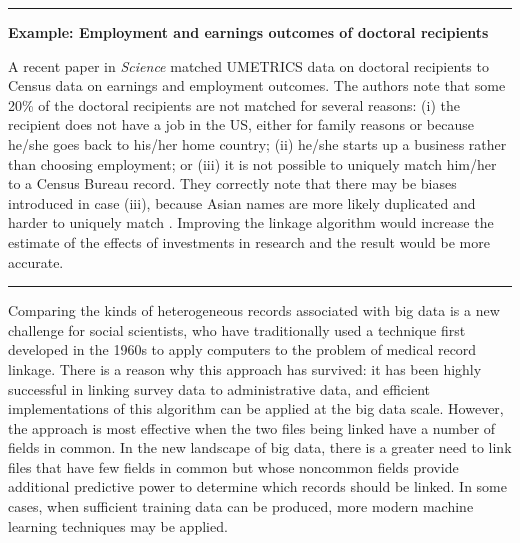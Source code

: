 \documentclass[]{krantz}
\begin{document}
\begin{center}\rule{0.5\linewidth}{\linethickness}\end{center}

\textbf{Example: Employment and earnings outcomes of doctoral
recipients}

A recent paper in \emph{Science} matched UMETRICS data on doctoral
recipients to Census data on earnings and employment outcomes. The
authors note that some 20\% of the doctoral recipients are not matched
for several reasons: (i) the recipient does not have a job in the US,
either for family reasons or because he/she goes back to his/her home
country; (ii) he/she starts up a business rather than choosing
employment; or (iii) it is not possible to uniquely match him/her to a
Census Bureau record. They correctly note that there may be biases
introduced in case (iii), because Asian names are more likely duplicated
and harder to uniquely match \citep{zolas2015wrapping}. Improving the
linkage algorithm would increase the estimate of the effects of
investments in research and the result would be more accurate.

\begin{center}\rule{0.5\linewidth}{\linethickness}\end{center}

Comparing the kinds of heterogeneous records associated with big data is
a new challenge for social scientists, who have traditionally used a
technique first developed in the 1960s to apply computers to the problem
of medical record linkage. There is a reason why this approach has
survived: it has been highly successful in linking survey data to
administrative data, and efficient implementations of this algorithm can
be applied at the big data scale. However, the approach is most
effective when the two files being linked have a number of fields in
common. In the new landscape of big data, there is a greater need to
link files that have few fields in common but whose noncommon fields
provide additional predictive power to determine which records should be
linked. In some cases, when sufficient training data can be produced,
more modern machine learning techniques may be applied.
\end{document}
